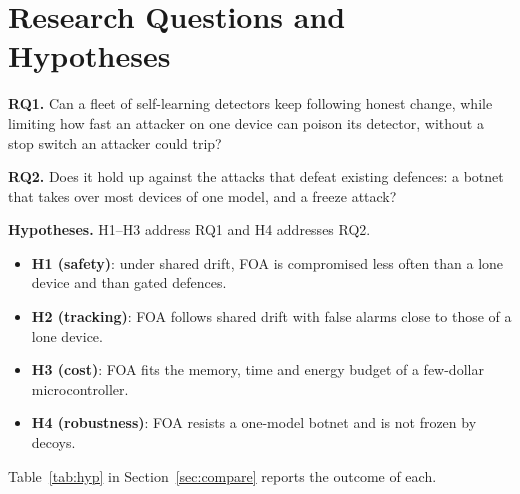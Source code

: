 \section{Research Questions and Hypotheses}\label{sec:rq}

\textbf{RQ1.} Can a fleet of self-learning detectors keep following honest change, while limiting how fast
an attacker on one device can poison its detector, without a stop switch an attacker could trip?

\textbf{RQ2.} Does it hold up against the attacks that defeat existing defences: a botnet that takes
over most devices of one model, and a freeze attack?

\textbf{Hypotheses.} H1--H3 address RQ1 and H4 addresses RQ2.
\begin{itemize}
\item \textbf{H1 (safety)}: under shared drift, FOA is compromised less often than a lone device and than
  gated defences.
\item \textbf{H2 (tracking)}: FOA follows shared drift with false alarms close to those of a lone device.
\item \textbf{H3 (cost)}: FOA fits the memory, time and energy budget of a few-dollar microcontroller.
\item \textbf{H4 (robustness)}: FOA resists a one-model botnet and is not frozen by decoys.
\end{itemize}
Table~\ref{tab:hyp} in Section~\ref{sec:compare} reports the outcome of each.
